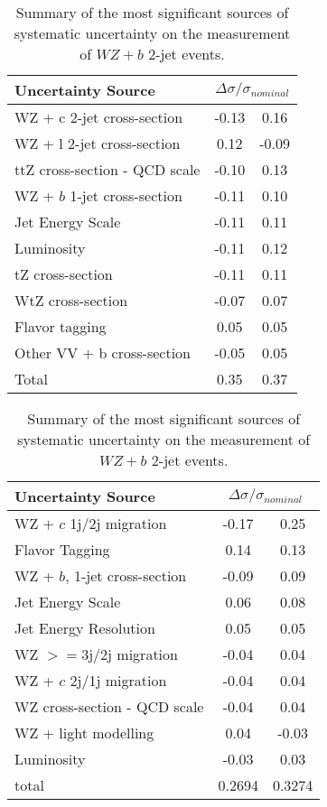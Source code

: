 \begin{table}[H]
    \centering
    \begin{tabular}{l|cc}
        \hline\hline
        Uncertainty Source & \multicolumn{2}{c}{$\Delta \sigma/\sigma_{nominal}$ }  \\
        \hline
        WZ + c 2-jet cross-section & -0.13 & 0.16 \\
        WZ + l 2-jet cross-section & 0.12 & -0.09 \\
        ttZ cross-section - QCD scale & -0.10 & 0.13 \\
        WZ + $b$ 1-jet cross-section & -0.11 & 0.10 \\
        Jet Energy Scale & -0.11 & 0.11 \\
        Luminosity & -0.11 & 0.12 \\
        tZ cross-section & -0.11 & 0.11 \\
        WtZ cross-section & -0.07 & 0.07 \\
        Flavor tagging  & 0.05 & 0.05 \\
        Other VV + b cross-section & -0.05 & 0.05 \\
        \hline
        Total & 0.35 & 0.37 \\
        \hline\hline
    \end{tabular}
    \quad
    \begin{tabular}{l|cc}
        \hline\hline
        Uncertainty Source & \multicolumn{2}{c}{$\Delta \sigma/\sigma_{nominal}$ }  \\
        \hline
        WZ + $c$ 1j/2j migration & -0.17 & 0.25 \\
        Flavor Tagging & 0.14 & 0.13 \\
        WZ + $b$, 1-jet cross-section & -0.09 & 0.09 \\
        Jet Energy Scale & 0.06 & 0.08 \\
        Jet Energy Resolution & 0.05 & 0.05 \\
        WZ $>=$3j/2j migration & -0.04 & 0.04 \\
        WZ + $c$ 2j/1j migration & -0.04 & 0.04 \\
        WZ cross-section - QCD scale & -0.04 & 0.04 \\
        WZ + light modelling & 0.04 & -0.03 \\
        Luminosity & -0.03 & 0.03 \\
        \hline
        total & 0.2694 & 0.3274 \\
        \hline\hline
    \end{tabular}
    \caption{Summary of the most significant sources of systematic uncertainty on the measurement of $WZ+b$ 2-jet events.}
    \label{tab:systematics_2j}
\end{table}

